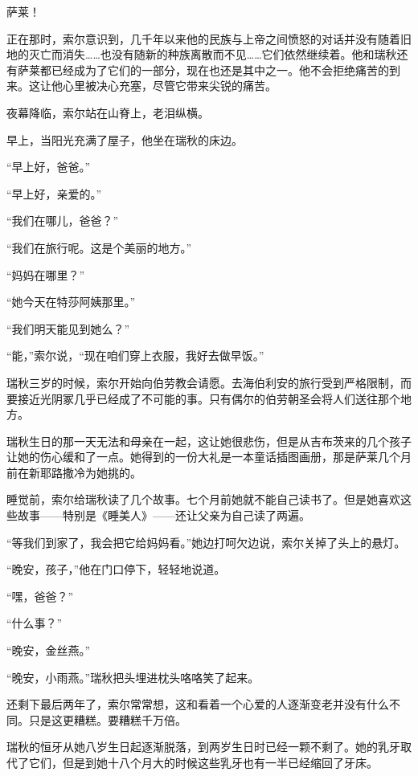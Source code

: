 \documentclass[AutoFakeBold=true]{book}
\begin{document}
{\kaishu 萨莱！}

正在那时，索尔意识到，几千年以来他的民族与上帝之间愤怒的对话并没有随着旧地的灭亡而消失……也没有随新的种族离散而不见……它们依然继续着。他和瑞秋还有萨莱都已经成为了它们的一部分，现在也还是其中之一。他不会拒绝痛苦的到来。这让他心里被决心充塞，尽管它带来尖锐的痛苦。

夜幕降临，索尔站在山脊上，老泪纵横。

早上，当阳光充满了屋子，他坐在瑞秋的床边。

``早上好，爸爸。''

``早上好，亲爱的。''

``我们在哪儿，爸爸？''

``我们在旅行呢。这是个美丽的地方。''

``妈妈在哪里？''

``她今天在特莎阿姨那里。''

``我们明天能见到她么？''

``能，''索尔说，``现在咱们穿上衣服，我好去做早饭。''

\vspace*{1em}

瑞秋三岁的时候，索尔开始向伯劳教会请愿。去海伯利安的旅行受到严格限制，而要接近光阴冢几乎已经成了不可能的事。只有偶尔的伯劳朝圣会将人们送往那个地方。

瑞秋生日的那一天无法和母亲在一起，这让她很悲伤，但是从吉布茨来的几个孩子让她的伤心缓和了一点。她得到的一份大礼是一本童话插图画册，那是萨莱几个月前在新耶路撒冷为她挑的。

睡觉前，索尔给瑞秋读了几个故事。七个月前她就不能自己读书了。但是她喜欢这些故事——特别是《睡美人》——还让父亲为自己读了两遍。

``等我们到家了，我会把它给妈妈看。''她边打呵欠边说，索尔关掉了头上的悬灯。

``晚安，孩子，''他在门口停下，轻轻地说道。

``嘿，爸爸？''

``什么事？''

``晚安，金丝燕。''

``晚安，小雨燕。''瑞秋把头埋进枕头咯咯笑了起来。

\vspace*{1em}

还剩下最后两年了，索尔常常想，这和看着一个心爱的人逐渐变老并没有什么不同。只是这更糟糕。要糟糕千万倍。

瑞秋的恒牙从她八岁生日起逐渐脱落，到两岁生日时已经一颗不剩了。她的乳牙取代了它们，但是到她十八个月大的时候这些乳牙也有一半已经缩回了牙床。
\end{document}
